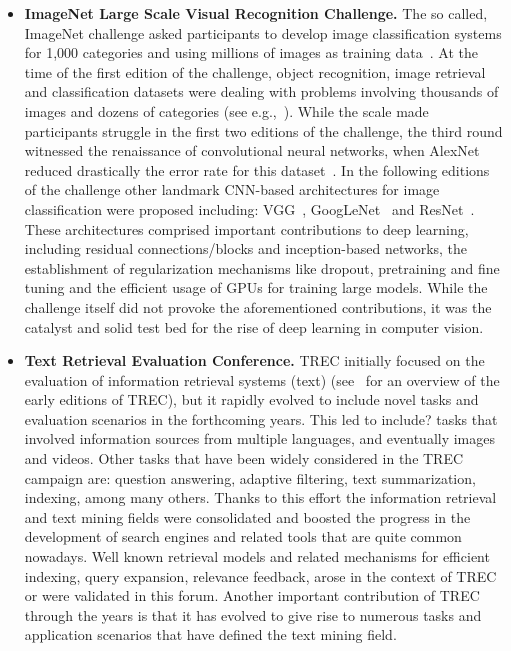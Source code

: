 \documentclass[twoside,11pt]{article}
\begin{document}
\begin{itemize}
    \item \textbf{ImageNet Large Scale Visual Recognition Challenge.} The so called, ImageNet challenge asked participants to develop image classification systems for 1,000 categories and using millions of images as training data~\citep{Russakovsky2015}. At the time of the first edition of the challenge, object recognition, image retrieval and classification datasets were dealing with problems involving thousands of images and dozens of categories (see e.g.,~\citep{DBLP:journals/cviu/EscalanteHGLMMSPG10}). While the scale made participants struggle in the first two editions of the challenge, the third round witnessed the renaissance of convolutional neural networks, when AlexNet reduced drastically the error rate for this dataset~\citep{DBLP:conf/nips/KrizhevskySH12}. In the following editions of the challenge other landmark CNN-based architectures for image classification were proposed including: VGG~\citep{DBLP:journals/corr/SimonyanZ14a}, GoogLeNet~\citep{DBLP:conf/cvpr/SzegedyLJSRAEVR15} and ResNet~\citep{DBLP:journals/corr/HeZRS15}. These architectures comprised important contributions to deep learning, including residual connections/blocks and inception-based networks, the establishment of regularization mechanisms like dropout, pretraining and fine tuning and the efficient usage of GPUs for training large models. While the challenge itself did not provoke %
    the aforementioned contributions, it was the catalyst and solid %
    test bed for the rise of deep learning in computer vision. 
    
    \item \textbf{Text Retrieval Evaluation Conference.} %
    TREC initially focused on the evaluation of information retrieval systems (text) (see~\citep{DBLP:journals/ipm/Muresan07,OVER2001369} for an overview of the early editions of TREC), but it rapidly evolved to include novel tasks and evaluation scenarios in the forthcoming years. This led %
    to include? tasks that involved information sources from multiple languages, and eventually images and videos. Other tasks that have been widely considered in the TREC campaign are: question answering, adaptive filtering, text summarization, indexing, among many others. Thanks to this effort the information retrieval and text mining fields were consolidated and boosted the progress in the development of search engines and related tools that are quite common nowadays. Well known retrieval models and related mechanisms for efficient indexing, query expansion, relevance feedback, arose in the context of TREC or were validated in this forum. %
    Another  important contribution of TREC through the years is that it has evolved to give rise to numerous tasks and application scenarios that have defined the text mining field. 
    

\end{itemize}
\end{document}
